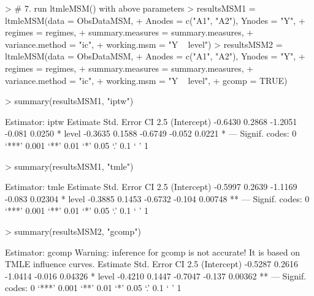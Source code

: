\documentclass[answers]{exam}
\begin{document}
\begin{solution}
\begin{Schunk}
\begin{Sinput}
> # 7. run ltmleMSM() with above parameters
> resultsMSM1 = ltmleMSM(data = ObsDataMSM, 
+                       Anodes = c("A1", "A2"), Ynodes = "Y",
+                       regimes = regimes, 
+                       summary.measures = summary.measures, 
+                       variance.method = "ic", 
+                       working.msm = "Y ~ level")
> resultsMSM2 = ltmleMSM(data = ObsDataMSM, 
+                             Anodes = c("A1", "A2"), Ynodes = "Y", 
+                             regimes = regimes, 
+                             summary.measures = summary.measures, 
+                             variance.method = "ic",
+                             working.msm = "Y ~ level", 
+                             gcomp = TRUE)
\end{Sinput}
\end{Schunk}
\begin{Schunk}
\begin{Sinput}
> summary(resultsMSM1, "iptw")
\end{Sinput}
\begin{Soutput}
Estimator:  iptw 
            Estimate Std. Error CI 2.5%
(Intercept)  -0.6430     0.2868 -1.2051   -0.081  0.0250 *
level        -0.3635     0.1588 -0.6749   -0.052  0.0221 *
---
Signif. codes:  0 ‘***’ 0.001 ‘**’ 0.01 ‘*’ 0.05 ‘.’ 0.1 ‘ ’ 1
\end{Soutput}
\begin{Sinput}
> summary(resultsMSM1, "tmle")
\end{Sinput}
\begin{Soutput}
Estimator:  tmle 
            Estimate Std. Error CI 2.5%
(Intercept)  -0.5997     0.2639 -1.1169   -0.083 0.02304 * 
level        -0.3885     0.1453 -0.6732   -0.104 0.00748 **
---
Signif. codes:  0 ‘***’ 0.001 ‘**’ 0.01 ‘*’ 0.05 ‘.’ 0.1 ‘ ’ 1
\end{Soutput}
\begin{Sinput}
> summary(resultsMSM2, "gcomp")
\end{Sinput}
\begin{Soutput}
Estimator:  gcomp 
Warning: inference for gcomp is not accurate! It is based on TMLE influence curves.
            Estimate Std. Error CI 2.5%
(Intercept)  -0.5287     0.2616 -1.0414   -0.016 0.04326 * 
level        -0.4210     0.1447 -0.7047   -0.137 0.00362 **
---
Signif. codes:  0 ‘***’ 0.001 ‘**’ 0.01 ‘*’ 0.05 ‘.’ 0.1 ‘ ’ 1
\end{Soutput}
\end{Schunk}



\end{solution}
\end{document}

